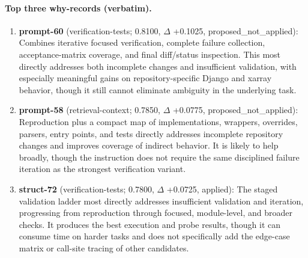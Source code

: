 \paragraph{Top three why-records (verbatim).}\begin{enumerate}\itemsep1pt
\item \textbf{prompt-60} (verification-tests; 0.8100, $\Delta$ +0.1025, proposed\_not\_applied): Combines iterative focused verification, complete failure collection, acceptance-matrix coverage, and final diff/status inspection. This most directly addresses both incomplete changes and insufficient validation, with especially meaningful gains on repository-specific Django and xarray behavior, though it still cannot eliminate ambiguity in the underlying task.
\item \textbf{prompt-58} (retrieval-context; 0.7850, $\Delta$ +0.0775, proposed\_not\_applied): Reproduction plus a compact map of implementations, wrappers, overrides, parsers, entry points, and tests directly addresses incomplete repository changes and improves coverage of indirect behavior. It is likely to help broadly, though the instruction does not require the same disciplined failure iteration as the strongest verification variant.
\item \textbf{struct-72} (verification-tests; 0.7800, $\Delta$ +0.0725, applied): The staged validation ladder most directly addresses insufficient validation and iteration, progressing from reproduction through focused, module-level, and broader checks. It produces the best execution and probe results, though it can consume time on harder tasks and does not specifically add the edge-case matrix or call-site tracing of other candidates.
\end{enumerate}
